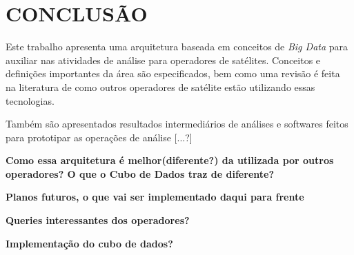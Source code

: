 
\chapter{CONCLUSÃO}

Este trabalho apresenta uma arquitetura baseada em conceitos de \textit{Big Data} para auxiliar nas atividades de análise para operadores de satélites. Conceitos e definições importantes da área são especificados, bem como uma revisão é feita na literatura de como outros operadores de satélite estão utilizando essas tecnologias.

Também são apresentados resultados intermediários de análises e softwares feitos para prototipar as operações de análise [...?]

\textbf{Como essa arquitetura é melhor(diferente?) da utilizada por outros operadores? O que o Cubo de Dados traz de diferente?}

\textbf{Planos futuros, o que vai ser implementado daqui para frente}

\textbf{Queries interessantes dos operadores?}

\textbf{Implementação do cubo de dados?}

